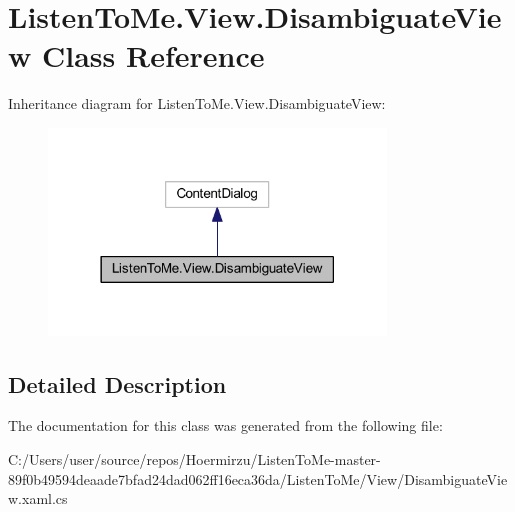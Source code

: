 \hypertarget{class_listen_to_me_1_1_view_1_1_disambiguate_view}{}\section{Listen\+To\+Me.\+View.\+Disambiguate\+View Class Reference}
\label{class_listen_to_me_1_1_view_1_1_disambiguate_view}


 




Inheritance diagram for Listen\+To\+Me.\+View.\+Disambiguate\+View\+:\nopagebreak
\begin{figure}[H]
\begin{center}
\leavevmode
\includegraphics[width=254pt]{class_listen_to_me_1_1_view_1_1_disambiguate_view__inherit__graph}
\end{center}
\end{figure}


\subsection{Detailed Description}




The documentation for this class was generated from the following file\+:\begin{DoxyCompactItemize}
\item 
C\+:/\+Users/user/source/repos/\+Hoermirzu/\+Listen\+To\+Me-\/master-\/89f0b49594deaade7bfad24dad062ff16eca36da/\+Listen\+To\+Me/\+View/Disambiguate\+View.\+xaml.\+cs\end{DoxyCompactItemize}
